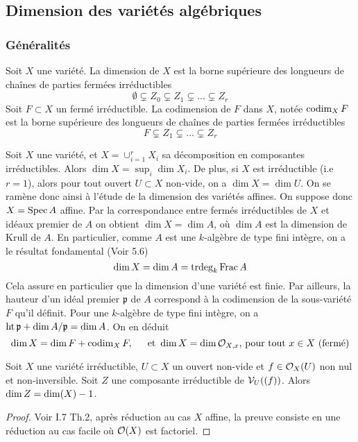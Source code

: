 \subsection{Dimension des variétés algébriques}

\subsubsection{Généralités}

\begin{defn}
Soit $X$ une variété. La dimension de $X$ est la borne supérieure des longueurs de chaînes de parties fermées irréductibles
$$\emptyset \varsubsetneq Z_0 \varsubsetneq Z_1 \varsubsetneq ... \varsubsetneq Z_r$$
Soit $F\subset X$ un fermé irréductible. La codimension de $F$ dans $X$, notée $\operatorname{codim}_X F$ est la borne supérieure des longueurs de chaînes de parties fermées irréductibles
$$F \varsubsetneq Z_1 \varsubsetneq ... \varsubsetneq Z_r$$
\end{defn}

Soit $X$ une variété, et $X=\cup_{i=1}^rX_i$ sa décomposition en composantes irréductibles. Alors $\dim X=\sup_i \dim X_i$. De plus, si $X$ est irréductible (i.e $r=1$), alors pour tout ouvert $U\subset X$ non-vide, on a $\dim X=\dim U$. On se ramène donc ainsi à l'étude de la dimension des variétés affines. On suppose donc $X=\operatorname{Spec} A$ affine. Par la correspondance entre fermés irréductibles de $X$ et idéaux premier de $A$ on obtient $\dim X= \dim A$, où $\dim A$ est la dimension de Krull de $A$. En particulier, comme $A$ est une $k$-algèbre de type fini intègre, on a le résultat fondamental (Voir \cite{Matsumura} 5.6)
$$\dim X=\dim A=\operatorname{trdeg}_k \operatorname{Frac} A$$
Cela assure en particulier que la dimension d'une variété est finie. Par ailleurs, la hauteur d'un idéal premier $\mathfrak{p}$ de $A$ correspond à la codimension de la sous-variété $F$ qu'il définit. Pour une $k$-algèbre de type fini intègre, on a $\operatorname{ht} \mathfrak{p}+ \dim A/\mathfrak{p}=\dim A$. On en déduit
$$\dim X=\dim F+\operatorname{codim}_X F,\,\,\,\,\,\,\, \text{ et } \dim X=\dim\mathcal{O}_{X,x} \text{, pour tout } x\in X \text{ (fermé)}$$

\begin{thm}\label{dimsousvariete}
Soit $X$ une variété irréductible, $U\subset X$ un ouvert non-vide et $f\in \mathcal{O}_X(U)$ non nul et non-inversible. Soit $Z$ une composante irréductible de $\mathcal{V}_U((f))$. Alors $\operatorname{dim} Z= \operatorname{dim}(X)-1$.
\end{thm}
\begin{proof}
Voir \cite{MumfordRedBook} I.7 Th.2, après réduction au cas $X$ affine, la preuve consiste en une réduction au cas facile où $\mathcal{O}(X)$ est factoriel. 
\end{proof}

